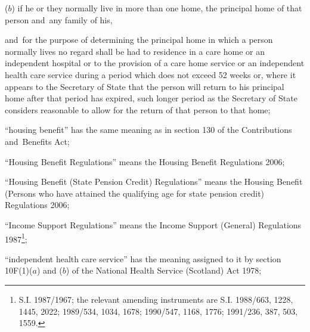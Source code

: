 \documentclass[12pt,a4paper]{article}
\begin{document}
\begin{enumerate}
\begin{enumerate}
($b$)
if he or they normally live in more than one home, the principal home of that person and~any family of his,
\end{enumerate}
and~for the purpose of determining the principal home in which a person normally lives no regard shall be had to residence in 
a care home or an independent hospital or to the provision of a care home service or an independent health care service  %
during a period which does not exceed 52 weeks or, where it appears to the 
Secretary of State  %
that the person will return to his principal home after that period has expired, such longer period as 
the Secretary of State  %
considers reasonable to allow for the return of that person to that home;

“housing benefit” has the same meaning as in section 130 of the Contributions and~Benefits Act;


“Housing Benefit Regulations” means the Housing Benefit Regulations 2006;

“Housing Benefit (State Pension Credit) Regulations” means the Housing Benefit (Persons who have attained the qualifying age for state pension credit) Regulations 2006;

“Income Support Regulations” means the Income Support (General) Regulations 1987\footnote{\frenchspacing S.I. 1987/1967; the relevant amending instruments are S.I. 1988/663, 1228, 1445, 2022; 1989/534, 1034, 1678; 1990/547, 1168, 1776; 1991/236, 387, 503, 1559.};


“independent health care service” has the meaning assigned to it by section 10F(1)($a$) and ($b$) of the National Health Service (Scotland) Act 1978;


\end{enumerate}
\end{document}
